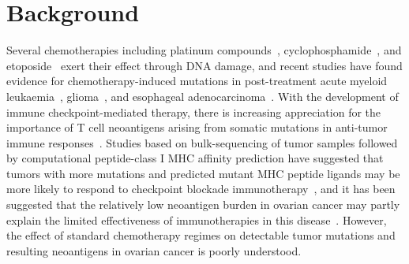 \section*{Background}

Several chemotherapies including platinum compounds~\cite{Hannan_1989}, cyclophosphamide~\cite{Anderson_1995}, and etoposide~\cite{NAKANOMYO_1986} exert their effect through DNA damage, and recent studies have found evidence for chemotherapy-induced mutations in post-treatment acute myeloid leukaemia~\cite{Ding_2012}, glioma~\cite{Johnson_2013}, and esophageal adenocarcinoma~\cite{Murugaesu_2015}. With the development of immune checkpoint-mediated therapy\cite{Chen_2013}, there is increasing appreciation for the importance of T cell neoantigens arising from somatic mutations in anti-tumor immune responses~\cite{Schumacher_2015}. Studies based on bulk-sequencing of tumor samples followed by computational peptide-class I MHC affinity prediction\cite{Lundegaard_2007} have suggested that tumors with more mutations and predicted mutant MHC peptide ligands may be more likely to respond to checkpoint blockade immunotherapy~\cite{Van_Allen_2015,Rizvi_2015}, and it has been suggested that the relatively low neoantigen burden in ovarian cancer may partly explain the limited effectiveness of immunotherapies in this disease~\cite{Martin_2016}. However, the effect of standard chemotherapy regimes on detectable tumor mutations and resulting neoantigens in ovarian cancer is poorly understood.


